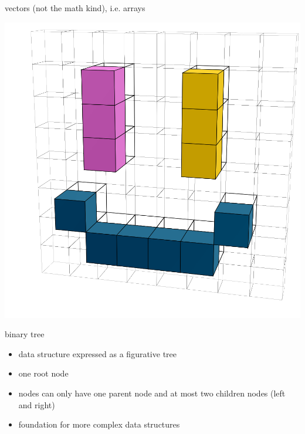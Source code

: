 \documentclass{beamer}
\begin{document}
	\begin{frame}{vectors (not the math kind), i.e. arrays}
		\begin{center}
			\includegraphics[width=\linewidth,height=0.85\textheight,keepaspectratio]{../assets/3d-array-rotated.png}
		\end{center}
	\end{frame}
	
	\begin{frame}{binary tree}
		\begin{itemize}
			\item[] data structure expressed as a figurative tree
			\item[] one root node
			\item[] nodes can only have one parent node and at most two children nodes (left and right)
			\item[] foundation for more complex data structures
		\end{itemize}
	\end{frame}
	
\end{document}
